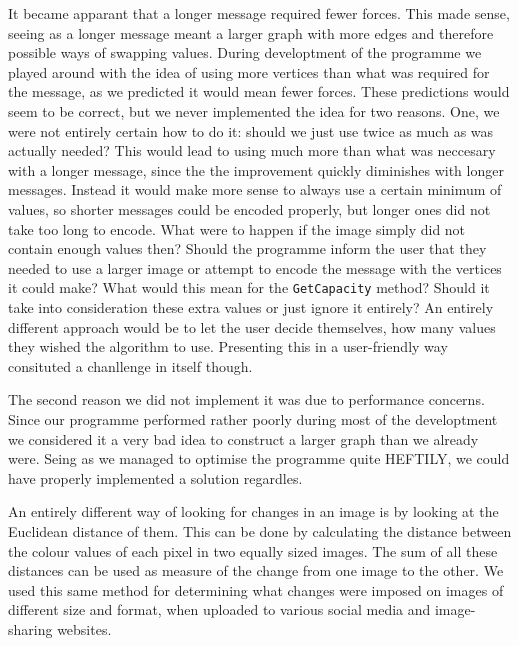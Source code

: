 It became apparant that a longer message required fewer forces. 
This made sense, seeing as a longer message meant a larger graph with more edges and therefore possible ways of swapping values.
During developtment of the programme we played around with the idea of using more vertices than what was required for the message, as we predicted it would mean fewer forces.
These predictions would seem to be correct, but we never implemented the idea for two reasons.
One, we were not entirely certain how to do it: should we just use twice as much as was actually needed?
This would lead to using much more than what was neccesary with a longer message, since the the improvement quickly diminishes with longer messages.
Instead it would make more sense to always use a certain minimum of values, so shorter messages could be encoded properly, but longer ones did not take too long to encode.
What were to happen if the image simply did not contain enough values then? 
Should the programme inform the user that they needed to use a larger image or attempt to encode the message with the vertices it could make?
What would this mean for the \lstinline|GetCapacity| method? 
Should it take into consideration these extra values or just ignore it entirely?
An entirely different approach would be to let the user decide themselves, how many values they wished the algorithm to use. 
Presenting this in a user-friendly way consituted a chanllenge in itself though.

The second reason we did not implement it was due to performance concerns.
Since our programme performed rather poorly during most of the developtment we considered it a very bad idea to construct a larger graph than we already were.
Seing as we managed to optimise the programme quite HEFTILY, we could have properly implemented a solution regardles.



An entirely different way of looking for changes in an image is by looking at the Euclidean distance of them.
This can be done by calculating the distance between the colour values of each pixel in two equally sized images.
The sum of all these distances can be used as measure of the change from one image to the other.
We used this same method for determining what changes were imposed on images of different size and format, when uploaded to various social media and image-sharing websites.

